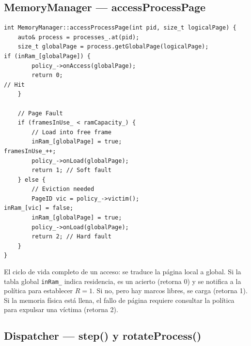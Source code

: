 \documentclass[12pt,letterpaper]{article}
\begin{document}
\subsection{MemoryManager --- accessProcessPage}

\begin{tcolorbox}[codebox, title={MemoryManager::accessProcessPage()}]
\begin{lstlisting}
int MemoryManager::accessProcessPage(int pid, size_t logicalPage) {
    auto& process = processes_.at(pid);
    size_t globalPage = process.getGlobalPage(logicalPage);
if (inRam_[globalPage]) {
        policy_->onAccess(globalPage);
        return 0;
// Hit
    }

    // Page Fault
    if (framesInUse_ < ramCapacity_) {
        // Load into free frame
        inRam_[globalPage] = true;
framesInUse_++;
        policy_->onLoad(globalPage);
        return 1; // Soft fault
    } else {
        // Eviction needed
        PageID vic = policy_->victim();
inRam_[vic] = false;
        inRam_[globalPage] = true;
        policy_->onLoad(globalPage);
        return 2; // Hard fault
    }
}
\end{lstlisting}
\end{tcolorbox}
El ciclo de vida completo de un acceso: se traduce la página local a global.
Si la tabla global \texttt{inRam\_} indica residencia, es un acierto (retorna 0) y se notifica a la política para establecer $R=1$.
Si no, pero hay marcos libres, se carga (retorna 1).
Si la memoria física está llena, el fallo de página requiere consultar la política para expulsar una víctima (retorna 2).
\subsection{Dispatcher --- step() y rotateProcess()}
\end{document}
